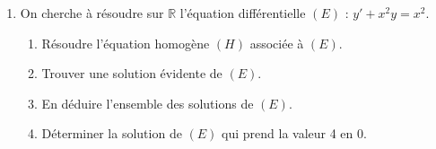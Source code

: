 
\begin{exercice}\label{exostarterST-0024}


\begin{enumerate}
\item On cherche à résoudre sur $\mathbb{R}$ l'équation différentielle $(E)$ : $y'+x^2y=x^2$.
\begin{enumerate}
\item Résoudre l'équation homogène $(H)$ associée à $(E)$.
\item Trouver une solution évidente de $(E)$.
\item En déduire l'ensemble des solutions de $(E)$.
\item Déterminer la solution de $(E)$ qui prend la valeur 4 en 0.
\end{enumerate}
\end{enumerate}
  

\end{exercice}
